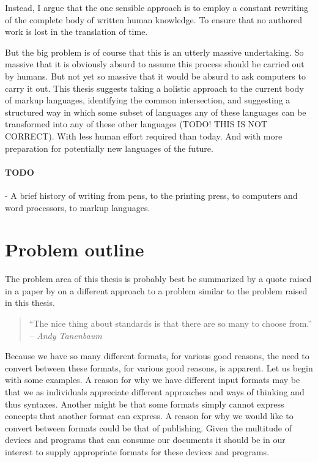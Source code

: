 \documentclass{scrreprt}
\begin{document}
Instead, I argue that the one sensible approach is to employ a constant rewriting of the complete body of written human knowledge. To ensure that no authored work is lost in the translation of time.

But the big problem is of course that this is an utterly massive undertaking. So massive that it is obviously absurd to assume this process should be carried out by humans. But not yet so massive that it would be absurd to ask computers to carry it out. This thesis suggests taking a holistic approach to the current body of markup languages, identifying the common intersection, and suggesting a structured way in which some subset of languages any of these languages can be transformed into any of these other languages (TODO! THIS IS NOT CORRECT). With less human effort required than today. And with more preparation for potentially new languages of the future.

\paragraph{TODO}
- A brief history of writing from pens, to the printing press, to computers and word processors, to markup languages.
 




\section{Problem outline}
\label{sec:problems}
The problem area of this thesis is probably best be summarized by a quote raised in a paper by \cite*{krijnen} on a different approach to a problem similar to the problem raised in this thesis.

\begin{quote}
``The nice thing about standards is that there are so many to choose from.''\\
\textit{-- Andy Tanenbaum}
\end{quote}

Because we have so many different formats, for various good reasons, the need to convert between these formats, for various good reasons, is apparent. Let us begin with some examples. A reason for why we have different input formats may be that we as individuals appreciate different approaches and ways of thinking and thus syntaxes. Another might be that some formats simply cannot express concepts that another format can express. A reason for why we would like to convert between formats could be that of publishing. Given the multitude of devices and programs that can consume our documents it should be in our interest to supply appropriate formats for these devices and programs. 
\end{document}
